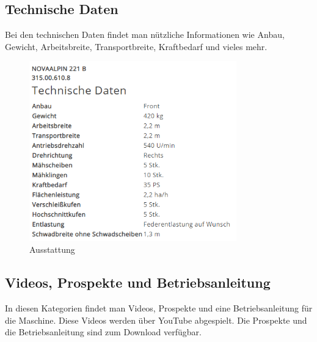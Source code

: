 \subsection{Technische Daten}
Bei den technischen Daten findet man nützliche Informationen wie Anbau, Gewicht, Arbeitsbreite, Transportbreite, Kraftbedarf und vieles mehr.
\begin{figure}[H]
	\centerline{
		\includegraphics[width=0.8\textwidth]{./grafiken/erm_detailansicht_technisch.PNG}
	}
	\vskip0pt
	\caption{Ausstattung} \label{fig:ausstattung}
\end{figure}
\subsection{Videos, Prospekte und Betriebsanleitung}
In diesen Kategorien findet man Videos, Prospekte und eine Betriebsanleitung für die Maschine. Diese Videos werden über YouTube abgespielt. Die Prospekte und die Betriebsanleitung sind zum Download verfügbar.
